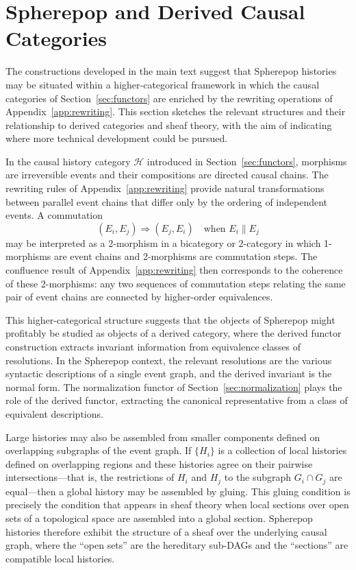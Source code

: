 \documentclass[12pt]{article}
\theoremstyle{plain}
\theoremstyle{definition}
\theoremstyle{remark}
\begin{document}
\section{Spherepop and Derived Causal Categories}
\label{app:derived}

The constructions developed in the main text suggest that Spherepop histories
may be situated within a higher-categorical framework in which the causal
categories of Section~\ref{sec:functors} are enriched by the rewriting
operations of Appendix~\ref{app:rewriting}.  This section sketches the relevant
structures and their relationship to derived categories and sheaf theory, with
the aim of indicating where more technical development could be pursued.

In the causal history category $\mathcal{H}$ introduced in
Section~\ref{sec:functors}, morphisms are irreversible events and their
compositions are directed causal chains.  The rewriting rules of
Appendix~\ref{app:rewriting} provide natural transformations between parallel
event chains that differ only by the ordering of independent events.  A
commutation
\[
  (E_i, E_j) \Rightarrow (E_j, E_i)
  \quad \text{when } E_i \parallel E_j
\]
may be interpreted as a 2-morphism in a bicategory or 2-category in which
1-morphisms are event chains and 2-morphisms are commutation steps.  The
confluence result of Appendix~\ref{app:rewriting} then corresponds to the
coherence of these 2-morphisms: any two sequences of commutation steps
relating the same pair of event chains are connected by higher-order
equivalences.

This higher-categorical structure suggests that the objects of Spherepop might
profitably be studied as objects of a derived category, where the derived
functor construction extracts invariant information from equivalence classes
of resolutions.  In the Spherepop context, the relevant resolutions are the
various syntactic descriptions of a single event graph, and the derived
invariant is the normal form.  The normalization functor of
Section~\ref{sec:normalization} plays the role of the derived functor,
extracting the canonical representative from a class of equivalent
descriptions.

Large histories may also be assembled from smaller components defined on
overlapping subgraphs of the event graph.  If $\{H_i\}$ is a collection of
local histories defined on overlapping regions and these histories agree on
their pairwise intersections---that is, the restrictions of $H_i$ and $H_j$
to the subgraph $G_i \cap G_j$ are equal---then a global history may be
assembled by gluing.  This gluing condition is precisely the condition that
appears in sheaf theory when local sections over open sets of a topological
space are assembled into a global section.  Spherepop histories therefore
exhibit the structure of a sheaf over the underlying causal graph, where the
``open sets'' are the hereditary sub-DAGs and the ``sections'' are compatible
local histories.
\end{document}
